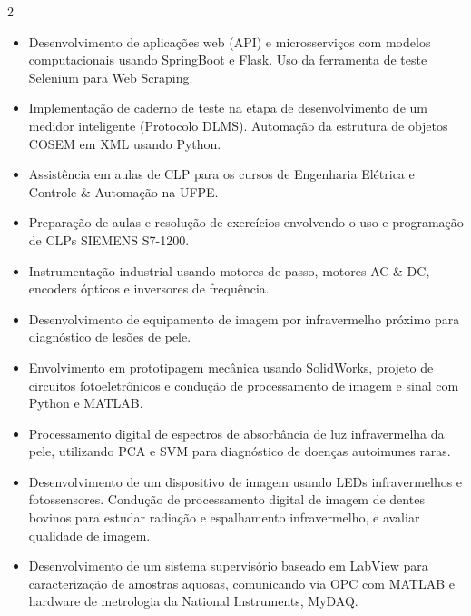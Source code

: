 \documentclass[10pt,a4paper,ragged2e,withhyper]{altacv}
\begin{document}
\begin{paracol}{2}
\begin{itemize}
    \item Desenvolvimento de aplicações web (API) e microsserviços com modelos computacionais usando SpringBoot e Flask. Uso da ferramenta de teste Selenium para Web Scraping.
    
    \item Implementação de caderno de teste na etapa de desenvolvimento de um medidor inteligente (Protocolo DLMS). Automação da estrutura de objetos COSEM em XML usando Python.
    
\end{itemize}
\divider

\begin{itemize}

    \item Assistência em aulas de CLP para os cursos de Engenharia Elétrica e Controle \& Automação na UFPE.
    \item Preparação de aulas e resolução de exercícios envolvendo o uso e programação de CLPs SIEMENS S7-1200.
    \item Instrumentação industrial usando motores de passo, motores AC \& DC, encoders ópticos e inversores de frequência.
    
\end{itemize}

\divider

\begin{itemize}

    \item Desenvolvimento de equipamento de imagem por infravermelho próximo para diagnóstico de lesões de pele.
    \item Envolvimento em prototipagem mecânica usando SolidWorks, projeto de circuitos fotoeletrônicos e condução de processamento de imagem e sinal com Python e MATLAB.
    \item Processamento digital de espectros de absorbância de luz infravermelha da pele, utilizando PCA e SVM para diagnóstico de doenças autoimunes raras.
    \item Desenvolvimento de um dispositivo de imagem usando LEDs infravermelhos e fotossensores. Condução de processamento digital de imagem de dentes bovinos para estudar radiação e espalhamento infravermelho, e avaliar qualidade de imagem.
    \item Desenvolvimento de um sistema supervisório baseado em LabView para caracterização de amostras aquosas, comunicando via OPC com MATLAB e hardware de metrologia da National Instruments, MyDAQ.
    

\end{itemize}
\end{paracol}
\end{document}
